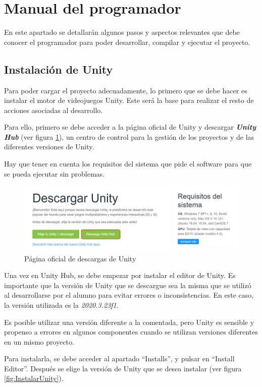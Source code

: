 \section{Manual del programador}
En este apartado se detallarán algunos pasos y aspectos relevantes que debe conocer el programador para poder desarrollar, compilar y ejecutar el proyecto.
\subsection{Instalación de Unity}
Para poder cargar el proyecto adecuadamente, lo primero que se debe hacer es instalar el motor de videojuegos Unity. Este será la base para realizar el resto de acciones asociadas al desarrollo.

Para ello, primero se debe acceder a la página oficial de Unity y descargar \textbf{\textit{Unity Hub}} (ver figura \ref{fig:DescargarUnity}), un centro de control para la gestión de los proyectos y de las diferentes versiones de Unity.

Hay que tener en cuenta los requisitos del sistema que pide el software para que se pueda ejecutar sin problemas.

\begin{figure}[h]
    \centering
    \includegraphics[scale=0.45]{img/UnityDownload.jpg}
    \caption{Página oficial de descargas de Unity}
    \label{fig:DescargarUnity}
    \end{figure}
    
Una vez en Unity Hub, se debe empezar por instalar el editor de Unity. Es importante que la versión de Unity que se descargue sea la misma que se utilizó al desarrollarse por el alumno para evitar errores o inconsistencias. En este caso, la versión utilizada es la \textit{2020.3.23f1}.

Es posible utilizar una versión diferente a la comentada, pero Unity es sensible y propenso a errores en algunos componentes cuando se utilizan versiones diferentes en un mismo proyecto.

Para instalarla, se debe acceder al apartado ``Installs'', y pulsar en ``Install Editor''. Después se elige la versión de Unity que se desea instalar (ver figura \ref{fig:InstalarUnity}).

